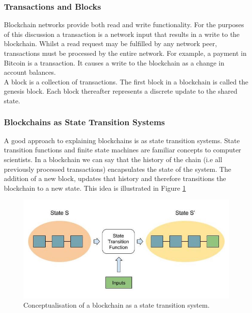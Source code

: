 \subsubsection{Transactions and Blocks}
Blockchain networks provide both read and write functionality. For the purposes of this discussion a transaction is a network input that results in a write to the blockchain. Whilst a read request may be fulfilled by any network peer, transactions must be processed by the entire network. For example, a payment in Bitcoin is a transaction. It causes a write to the blockchain as a change in account balances. \\

A block is a collection of transactions. The first block in a blockchain is called the genesis block. Each block thereafter represents a discrete update to the shared state. \\

\subsubsection{Blockchains as State Transition Systems}
A good approach to explaining blockchains is as state transition systems. State transition functions and finite state machines are familiar concepts to computer scientists. In a blockchain we can say that the history of the chain (i.e all previously processed transactions) encapsulates the state of the system. The addition of a new block, updates that history and therefore transitions the blockchain to a new state. This idea is illustrated in Figure \ref{fig:blockchain_transition} \\

\begin{figure}
\centering
\includegraphics[width=1.4\textwidth]{Figures/blockchain_transition}
\decoRule
\caption[Blockchain As State Transition]{Conceptualisation of a blockchain as a state transition system.}
\label{fig:blockchain_transition}
\end{figure}

